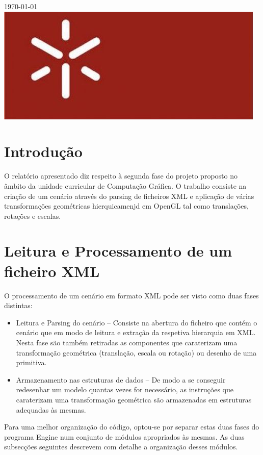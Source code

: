 \documentclass[12pt]{article}
\begin{document}
\begin{titlepage}

{\large \today}\\[2cm]


\includegraphics[scale=0.3]{uminho}\\
    

\vfill %

\end{titlepage}
\tableofcontents
\newpage
\section{Introdução}
O relatório apresentado diz respeito à segunda fase  do projeto proposto no âmbito da unidade curricular de
Computação Gráfica. O trabalho consiste na criação de um cenário através do parsing de ficheiros XML e aplicação de várias
transformações geométricas hierquicamenjd em OpenGL tal como translações, rotações e escalas.

\section{Leitura e Processamento de um ficheiro XML}
O processamento de um cenário em formato XML pode ser visto como duas fases
distintas:
\begin{itemize}
\item Leitura e Parsing do cenário – Consiste na abertura do ficheiro que contém o
cenário que em modo de leitura e extração da respetiva hierarquia em XML. Nesta
fase são também retiradas as componentes que caraterizam uma
transformação geométrica (translação, escala ou rotação) ou desenho de uma
primitiva.
\item Armazenamento nas estruturas de dados – De modo a se conseguir redesenhar
um modelo quantas vezes for necessário, as instruções que caraterizam uma
transformação geométrica são armazenadas em estruturas adequadas às
mesmas.
\end{itemize}
Para uma melhor organização do código, optou-se por separar estas duas fases do
programa Engine num conjunto de módulos apropriados às mesmas. As duas subsecções
seguintes descrevem com detalhe a organização desses módulos. 
\end{document}
